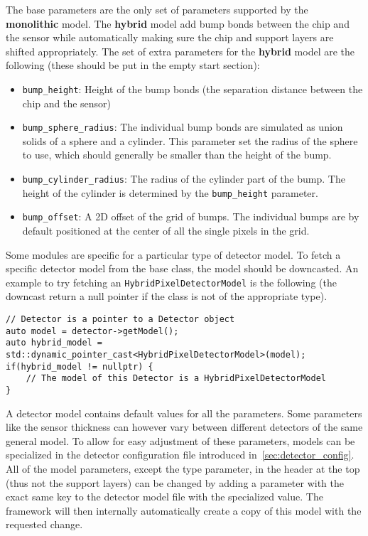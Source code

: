 The base parameters are the only set of parameters supported by the \textbf{monolithic} model.
The \textbf{hybrid} model add bump bonds between the chip and the sensor while automatically making sure the chip and support layers are shifted appropriately.
The set of extra parameters for the \textbf{hybrid} model are the following (these should be put in the empty start section):
\begin{itemize}
\item \texttt{bump\_height}: Height of the bump bonds (the separation distance between the chip and the sensor)
\item \texttt{bump\_sphere\_radius}: The individual bump bonds are simulated as union solids of a sphere and a cylinder.
This parameter set the radius of the sphere to use, which should generally be smaller than the height of the bump.
\item \texttt{bump\_cylinder\_radius}: The radius of the cylinder part of the bump.
The height of the cylinder is determined by the \texttt{bump\_height} parameter.
\item \texttt{bump\_offset}: A 2D offset of the grid of bumps.
The individual bumps are by default positioned at the center of all the single pixels in the grid.
\end{itemize}

Some modules are specific for a particular type of detector model.
To fetch a specific detector model from the base class, the model should be downcasted.
An example to try fetching an \texttt{HybridPixelDetectorModel} is the following (the downcast return a null pointer if the class is not of the appropriate type).
\begin{verbatim}
// Detector is a pointer to a Detector object
auto model = detector->getModel();
auto hybrid_model = std::dynamic_pointer_cast<HybridPixelDetectorModel>(model);
if(hybrid_model != nullptr) {
    // The model of this Detector is a HybridPixelDetectorModel
}
\end{verbatim}

A detector model contains default values for all the parameters.
Some parameters like the sensor thickness can however vary between different detectors of the same general model.
To allow for easy adjustment of these parameters, models can be specialized in the detector configuration file introduced in~\ref{sec:detector_config}.
All of the model parameters, except the type parameter, in the header at the top (thus not the support layers) can be changed by adding a parameter with the exact same key to the detector model file with the specialized value.
The framework will then internally automatically create a copy of this model with the requested change.


